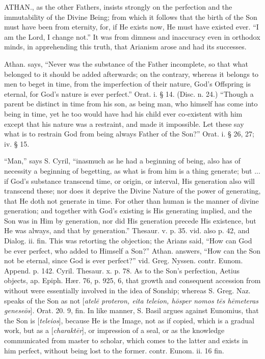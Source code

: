 
ATHAN.,
as the other Fathers, insists strongly on the perfection and the
immutability of the Divine Being; from which it follows that the birth
of the Son must have been from eternity, for, if He exists now, He
must have existed ever. ``I am the Lord, I change not.'' It was from
dimness and inaccuracy even in orthodox minds, in apprehending this
truth, that Arianism arose and had its successes.

Athan. says, ``Never was the substance of the
Father incomplete, so that what belonged to it should be added
afterwards; on the contrary, whereas it belongs to men to beget in
time, from the imperfection of their nature, God's Offspring is
eternal, for God's nature is ever perfect.'' Orat. i. § 14. (Disc. n.
24.) ``Though a parent be distinct in time from his son, as being man,
who himself has come into being in time, yet he too would have had his
child ever co-existent with him except that his nature was a
restraint, and made it impossible. Let these say what is to restrain
God from being always Father of the Son?'' Orat. i. § 26, 27; iv. §
15.

``Man,'' says S. Cyril, ``inasmuch as he had a
beginning of being, also has of necessity a beginning of begetting, as
what is from him is a thing generate; but ... if God's substance
transcend time, or origin, or interval, His generation also will
transcend these; nor does it deprive the Divine Nature of the power of
generating, that He doth not generate in time. For other than human is
the manner of divine generation; and together with God's existing is
His generating implied, and the Son was in Him by generation, nor did
His generation precede His existence, but He was always, and that by
generation.'' Thesaur. v. p. 35. vid. also p. 42, and Dialog. ii. fin.
This was retorting the objection; the Arians said, ``How can God be
ever perfect, who added to Himself a Son?'' Athan. answers, ``How can
the Son not be eternal, since God is ever perfect?'' vid. Greg. Nyssen.
contr. Eunom. Append. p. 142. Cyril. Thesaur. x. p. 78. As to the Son's
perfection, Aetius objects, ap. Epiph. Hær. 76, p. 925, 6, that
growth and consequent accession from without were essentially involved
in the idea of Sonship; whereas S. Greg. Naz. speaks of the Son as not
[\emph{atel\={e} proteron, eita teleion, h\={o}sper nomos t\={e}s
h\={e}meteras genese\={o}s}]. Orat. 20. 9, fin. In like
manner, S. Basil argues against Eunomius, that the Son is [\emph{teleios}],
because He is the Image, not as if copied, which is a gradual work,
but as a [\emph{charakt\={e}r}], or impression of a seal, or as the
knowledge communicated from master to scholar, which comes to the
latter and exists in him perfect, without being lost to the former.
contr. Eunom. ii. 16 fin.

